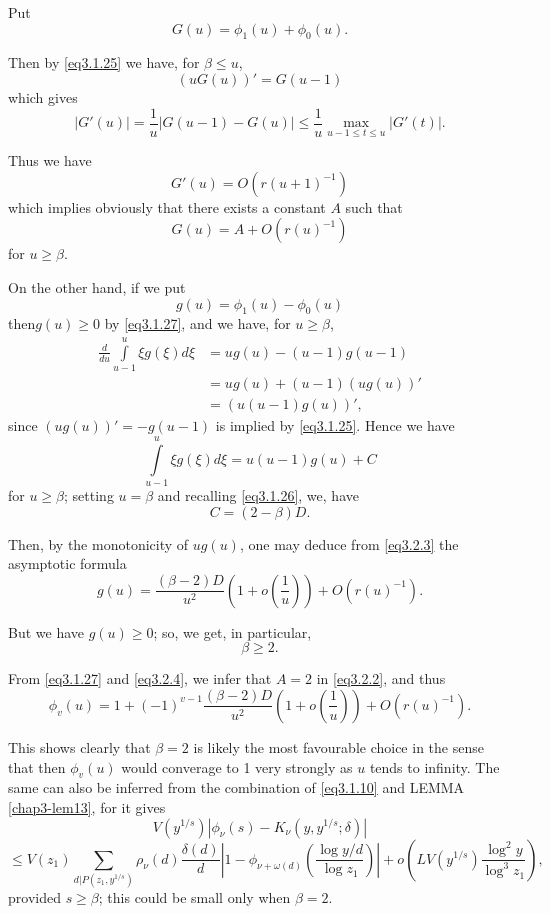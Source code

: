Put
$$
G(u)= \phi_1(u)+ \phi_0 (u).
$$

Then by \eqref{eq3.1.25} we have, for $\beta \le u$,
$$
(u G(u))'=G(u-1)
$$
which gives
$$
|G'(u)|=\frac{1}{u}|G(u-1)-G(u)| \le \frac{1}{u} \max _{u-1 \le t \le
  u} |G' (t)|. 
$$

Thus we have
$$
G'(u)=O\left(r (u+1)^{-1}\right)
$$
which implies obviously that there exists a constant $A$ such that 
\begin{equation*}
  G(u)=A+O(r (u)^{-1}) \tag{3.2.2}\label{eq3.2.2}
\end{equation*}
for $u \ge \beta$.

On the other hand, if we put
$$
g(u)=\phi_1 (u)- \phi_0 (u)
$$
then\pageoriginale $g(u)\ge 0$ by \eqref{eq3.1.27}, and we have, for
$u \ge \beta$, 
\begin{align*}
  \frac{d}{du} \int \limits ^u_{u-1} \xi g(\xi)d \xi &= ug(u)-(u-1)g (u-1)\\
  &=ug(u)+(u-1)(ug(u))'\\
  &= (u(u-1)g(u))', 
\end{align*}
since $(ug(u))'=-g(u-1)$ is implied by \eqref{eq3.1.25}. Hence we have 
\begin{equation*}
\int \limits ^u_{u-1}\xi g(\xi)d \xi = u(u-1)g(u)+C \tag{3.2.3}\label{eq3.2.3}
\end{equation*}
for $u \ge \beta$; setting $u= \beta$ and recalling \eqref{eq3.1.26}, we, have 
$$
C=(2- \beta)D.
$$

Then, by the monotonicity of $ug(u)$, one may deduce from \eqref{eq3.2.3} the
asymptotic formula 
\begin{equation*}
g(u)= \frac {(\beta -2)D}{u^2} \left(1+ o\left(\frac {1}{u}\right)\right)+O(r
(u)^{-1}). \tag{3.2.4} \label{eq3.2.4}
\end{equation*}

But we have $g(u)\ge 0$; so, we get, in particular,
\begin{equation*}
\beta \ge 2. \tag{3.2.5}\label{eq3.2.5}
\end{equation*}

From \eqref{eq3.1.27} and \eqref{eq3.2.4}, we infer that $A=2$ in
\eqref{eq3.2.2}, and thus 
$$
\phi_v(u)=1+(-1)^{v-1} \frac{(\beta -2)D}{u^2} \left(1+ o\left(\frac
    {1}{u}\right)\right)+O\left(r (u)^{-1}\right). 
$$

This shows clearly that $\beta =2$ is likely the most favourable
choice in the sense that then $\phi_v(u)$ would converage to 1 very
strongly as $u$ tends to infinity. The same can also be inferred from
the combination of \eqref{eq3.1.10} and LEMMA \ref{chap3-lem13}, for it gives 
$$
V(y^{1/s})|\phi_\nu(s)-K_\nu(y,y^{1/s};\delta)|
$$
\begin{equation*}
  \le V(z_1)\sum_{d|P(z_1,y^{1/s})}\rho_\nu
  (d)\frac{\delta(d)}{d}|1-\phi_{\nu + \omega(d)}\left(\frac{\log y/d}{\log
    z_1}\right)|+ o\left(LV(y^{1/s}) \frac{\log^2y}{\log^3 z_1}\right),
  \tag{3.2.6}  \label{eq3.2.6}
\end{equation*}\pageoriginale
provided $s \ge \beta$; this could be small only when $\beta=2$.

